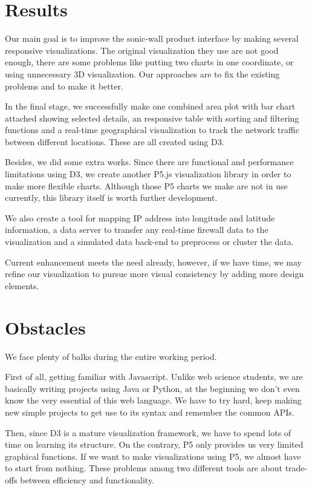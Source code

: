 \section{Results}
Our main goal is to improve the sonic-wall product interface by making several responsive visualizations. The original visualization they use are not good enough, there are some problems like putting two charts in one coordinate, or using unnecessary 3D visualization. Our approaches are to fix the existing problems and to make it better.

In the final stage, we successfully make one combined area plot with bar chart attached showing selected details, an responsive table with sorting and filtering functions and a real-time geographical visualization to track the network traffic between different locations. These are all created using D3.

Besides, we did some extra works. Since there are functional and performance limitations using D3, we create another P5.js visualization library in order to make more flexible charts. Although those P5 charts we make are not in use currently, this library itself is worth further development.

We also create a tool for mapping IP address into longitude and latitude information, a data server to transfer any real-time firewall data to the visualization and a simulated data back-end to preprocess or cluster the data.

Current enhancement meets the need already, however, if we have time, we may refine our visualization to pursue more visual consistency by adding more design elements.

\section{Obstacles}
We face plenty of balks during the entire working period.

First of all, getting familiar with Javascript. Unlike web science students, we are basically writing projects using Java or Python, at the beginning we don't even know the very essential of this web language. We have to try hard, keep making new simple projects to get use to its syntax and remember the common APIs.

Then, since D3 is a mature visualization framework, we have to spend lots of time on learning its structure. On the contrary, P5 only provides us very limited graphical functions. If we want to make visualizations using P5, we almost have to start from nothing. These problems among two different tools are about trade-offs between efficiency and functionality.

